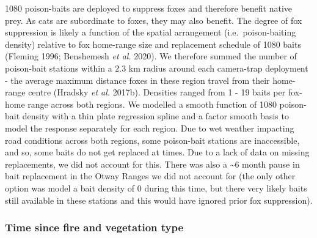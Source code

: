 \documentclass[11pt,a4paper,titlepage,twoside,openright]{style/unimelbthesis}
\begin{document}
\begin{mainmatter}
1080 poison-baits are deployed to suppress foxes and therefore benefit native prey. As cats are subordinate to foxes, they may also benefit. The degree of fox suppression is likely a function of the spatial arrangement (i.e.~poison-baiting density) relative to fox home-range size and replacement schedule of 1080 baits (Fleming 1996; Benshemesh \emph{et al.} 2020). We therefore summed the number of poison-bait stations within a 2.3 km radius around each camera-trap deployment - the average maximum distance foxes in these region travel from their home-range centre (Hradsky \emph{et al.} 2017b). Densities ranged from 1 - 19 baits per fox-home range across both regions. We modelled a smooth function of 1080 poison-bait density with a thin plate regression spline and a factor smooth basis to model the response separately for each region. Due to wet weather impacting road conditions across both regions, some poison-bait stations are inaccessible, and so, some baits do not get replaced at times. Due to a lack of data on missing replacements, we did not account for this. There was also a \textasciitilde6 month pause in bait replacement in the Otway Ranges we did not account for (the only other option was model a bait density of 0 during this time, but there very likely baits still available in these stations and this would have ignored prior fox suppression).

\hypertarget{time-since-fire-and-vegetation-type}{%
\subsubsection{Time since fire and vegetation type}\label{time-since-fire-and-vegetation-type}}


\end{mainmatter}
\end{document}
